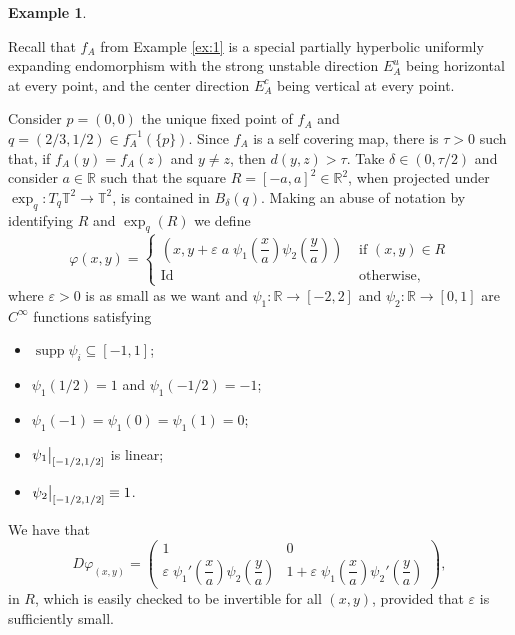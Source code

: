 \documentclass[a4paper,11pt,reqno]{amsart}
\newcommand\restr[2]{{ %
  \left.\kern-\nulldelimiterspace 
  #1 
  \vphantom{\big|} 
  \right|_{#2} 
  }}
\newcommand{\TT}{{\mathbb{T}^2}}
\theoremstyle{definition}
\newtheorem{example}{Example}
\begin{document}
\begin{example}
    \label{ex:3}

Recall that $f_A$ from Example \ref{ex:1} is a special partially hyperbolic uniformly expanding endomorphism with the strong unstable direction $E^u_A$ being horizontal at every point, and the center direction $E^c_A$ being vertical at every point. 

 Consider $p = (0, 0)$ the unique fixed point of $f_A$ and $q=(2/3,1/2) \in f_A^{-1}(\{p\})$. Since $f_A$ is a self covering map, there is $\tau > 0$ such that, if $f_A(y) = f_A(z)$ and $y \neq z$, then $d(y,z) > \tau$. Take $\delta \in (0, \tau/2)$ and consider $a \in \mathbb{R}$ such that the square $R = [-a,a]^2 \in \mathbb{R}^2$, when projected under $\exp_q: T_q\TT \to \TT$, is contained in $B_{\delta}(q)$. Making an abuse of notation by identifying $R$ and $\exp_q(R)$ we define
 $$\varphi(x,y) = \begin{cases}
 \left(x, y + \varepsilon \; a \; \psi_1\left( \dfrac{x}{a} \right) \psi_2\left( \dfrac{y}{a} \right) \right) & \mbox{ if } (x,y) \in R\\
 \operatorname{Id}    & \mbox{ otherwise, } 
 \end{cases}$$
 where $\varepsilon > 0$ is as small as we want and $\psi_1: \mathbb{R} \to [-2,2]$ and $\psi_2: \mathbb{R} \to [0,1]$ are $C^\infty$ functions satisfying
 \begin{itemize}
     \item $\operatorname{supp} \psi_i \subseteq [-1,1]$;
     \item $\psi_1(1/2) = 1$ and $\psi_1(-1/2) = -1$;
     \item $\psi_1(-1) = \psi_1(0) = \psi_1(1) = 0$;
     \item $\restr{\psi_1}{[-1/2,1/2]}$ is linear;
     \item $\restr{\psi_2}{[-1/2,1/2]} \equiv 1$.
 \end{itemize}

 We have that
 $$D\varphi_{(x,y)} = \begin{pmatrix}
1 & 0 \\
\varepsilon \; \psi_1'\left( \dfrac{x}{a} \right) \psi_2\left( \dfrac{y}{a} \right)  & 1 + \varepsilon \; \psi_1\left( \dfrac{x}{a} \right) \psi_2'\left( \dfrac{y}{a} \right)
\end{pmatrix},$$
in $R$, which is easily checked to be invertible for all $(x,y)$, provided that $\varepsilon$ is sufficiently small. 


\end{example}
\end{document}
